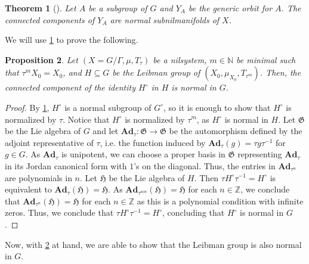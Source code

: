 \documentclass[letter, 11pt]{article}
\newtheorem{theorem}{Theorem}[section]
\newtheorem{proposition}[theorem]{Proposition}
\theoremstyle{definition}
\theoremstyle{plain}
\newcommand{\N}{\mathbb{N}}
\newcommand{\Z}{\mathbb{Z}}
\newcommand{\1}{\mathbbm{1}}
\begin{document}
\begin{theorem}[{\cite[Theorem 3.5]{Leibman03}}]\label{theo3.5L}
   Let $A$ be a subgroup of $G$ and $Y_A$ be the generic orbit for $A$. The connected components of $Y_A$ are normal subnilmanifolds of $X$.  
\end{theorem}
We will use \cref{theo3.5L} to prove the following.
\begin{proposition}\label{prop-for-H0}
    Let $(X=G/\Gamma,\mu,T_\tau)$ be a nilsystem, $m\in \N$ be minimal such that $\tau^mX_0=X_0$, and $H\subseteq G$ be the Leibman group of $(X_0,\mu_{X_0},T_{\tau^m})$. Then, the connected component of the identity $H^{\circ}$ in $H$ is normal in $G$.
\end{proposition}
\begin{proof}
   By \cref{theo3.5L}, $H^{\circ}$ is a normal subgroup of $G^{\circ}$, so it is enough to show that $H^{\circ}$ is normalized by $\tau$. Notice that $H^{\circ}$ is normalized by $\tau^m$, as $H^\circ$ is normal in $H$. Let $\mathfrak{G}$ be the Lie algebra of $G$ and let $\textbf{Ad}_\tau:\mathfrak{G}\to \mathfrak{G}$ be the automorphism defined by the adjoint representative of $\tau$, i.e. the function induced by $\textbf{Ad}_\tau(g)=\tau g\tau^{-1}$ for $g\in G$. As $\textbf{Ad}_\tau$ is unipotent, we can choose a proper basis in $\mathfrak{G}$ representing $\textbf{Ad}_\tau$ in its Jordan canonical form with $1$'s on the diagonal. Thus, the entries in $\textbf{Ad}_{\tau^n}$ are polynomials in $n$. Let $\mathfrak{H}$ be the Lie algebra of $H$. Then $\tau H^{\circ} \tau^{-1}=H^{\circ}$ is equivalent to $\textbf{Ad}_\tau( \mathfrak{H})=\mathfrak{H}$. As $\textbf{Ad}_{\tau^{nm}}( \mathfrak{H})=\mathfrak{H}$ for each $n\in \Z$, we conclude that $\textbf{Ad}_{\tau^{n}}( \mathfrak{H})=\mathfrak{H}$ for each $n\in \Z$ as this is a polynomial condition with infinite zeros. Thus, we conclude that $\tau H^{\circ} \tau^{-1}=H^{\circ}$, concluding that $H^{\circ}$ is normal in $G$.
\end{proof}

Now, with \cref{prop-for-H0} at hand, we are able to show that the Leibman group is also normal in $G$.
\end{document}
